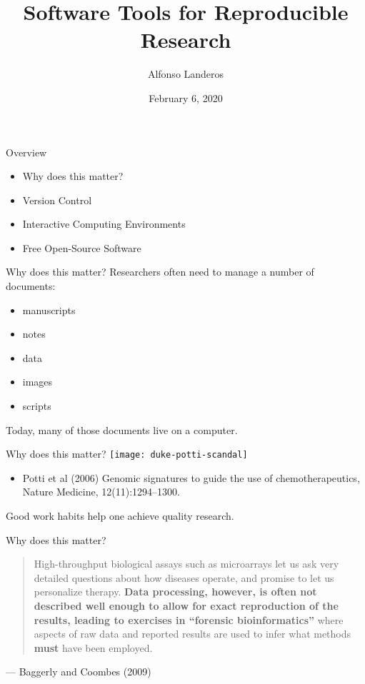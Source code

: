 \documentclass{beamer}
\title{Software Tools for Reproducible Research}
\author{Alfonso Landeros}
\date{February 6, 2020}
\begin{document}
\frame{\titlepage}

\begin{frame}{Overview}
  \begin{itemize}
    \item Why does this matter?

    \item Version Control

    \item Interactive Computing Environments

    \item Free Open-Source Software

  \end{itemize}
\end{frame}



\begin{frame}{Why does this matter?}
  Researchers often need to manage a number of documents: 
  \begin{itemize}
    \item manuscripts

    \item notes

    \item data

    \item images

    \item scripts
  \end{itemize}

  Today, many of those documents live on a computer.
\end{frame}

\begin{frame}{Why does this matter?}
  \center
  \texttt{[image: duke-potti-scandal]}

  \begin{itemize}
    \item \tiny Potti et al (2006) Genomic signatures to guide the use of chemotherapeutics, Nature Medicine, 12(11):1294--1300.
  \end{itemize}
  

  Good work habits help one achieve quality research.
\end{frame}

\begin{frame}{Why does this matter?}
  \begin{quote}
    \noindent High-throughput biological assays such as microarrays let us ask very detailed questions about how diseases operate, and promise to let us personalize therapy.
    \textbf{Data processing, however, is often not described well enough to allow for exact reproduction of the results, leading to exercises in ``forensic bioinformatics''} where aspects of raw data and reported results are used to infer what methods \textbf{must} have been employed.
  \end{quote}
  \center --- Baggerly and Coombes (2009)
  \hfill \\
\end{frame}
\end{document}
